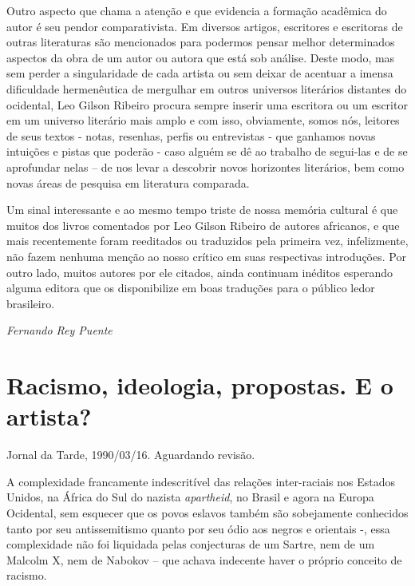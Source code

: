 \documentclass[
  letterpaper,
  DIV=11,
  numbers=noendperiod]{scrreprt}
\begin{document}
Outro aspecto que chama a atenção e que evidencia a formação acadêmica
do autor é seu pendor comparativista. Em diversos artigos, escritores e
escritoras de outras literaturas são mencionados para podermos pensar
melhor determinados aspectos da obra de um autor ou autora que está sob
análise. Deste modo, mas sem perder a singularidade de cada artista ou
sem deixar de acentuar a imensa dificuldade hermenêutica de mergulhar em
outros universos literários distantes do ocidental, Leo Gilson Ribeiro
procura sempre inserir uma escritora ou um escritor em um universo
literário mais amplo e com isso, obviamente, somos nós, leitores de seus
textos - notas, resenhas, perfis ou entrevistas - que ganhamos novas
intuições e pistas que poderão - caso alguém se dê ao trabalho de
segui-las e de se aprofundar nelas -- de nos levar a descobrir novos
horizontes literários, bem como novas áreas de pesquisa em literatura
comparada.

Um sinal interessante e ao mesmo tempo triste de nossa memória cultural
é que muitos dos livros comentados por Leo Gilson Ribeiro de autores
africanos, e que mais recentemente foram reeditados ou traduzidos pela
primeira vez, infelizmente, não fazem nenhuma menção ao nosso crítico em
suas respectivas introduções. Por outro lado, muitos autores por ele
citados, ainda continuam inéditos esperando alguma editora que os
disponibilize em boas traduções para o público ledor brasileiro.

\emph{Fernando Rey Puente}

\clearpage \thispagestyle{empty} \mbox{} \clearpage \mainmatter


\chapter{Racismo, ideologia, propostas. E o
artista?}\label{racismo-ideologia-propostas.-e-o-artista}

Jornal da Tarde, 1990/03/16. Aguardando revisão.

\hfill\break

A complexidade francamente indescritível das relações inter-raciais nos
Estados Unidos, na África do Sul do nazista \emph{apartheid}, no Brasil
e agora na Europa Ocidental, sem esquecer que os povos eslavos também
são sobejamente conhecidos tanto por seu antissemitismo quanto por seu
ódio aos negros e orientais -, essa complexidade não foi liquidada pelas
conjecturas de um Sartre, nem de um Malcolm X, nem de Nabokov -- que
achava indecente haver o próprio conceito de racismo.
\end{document}
